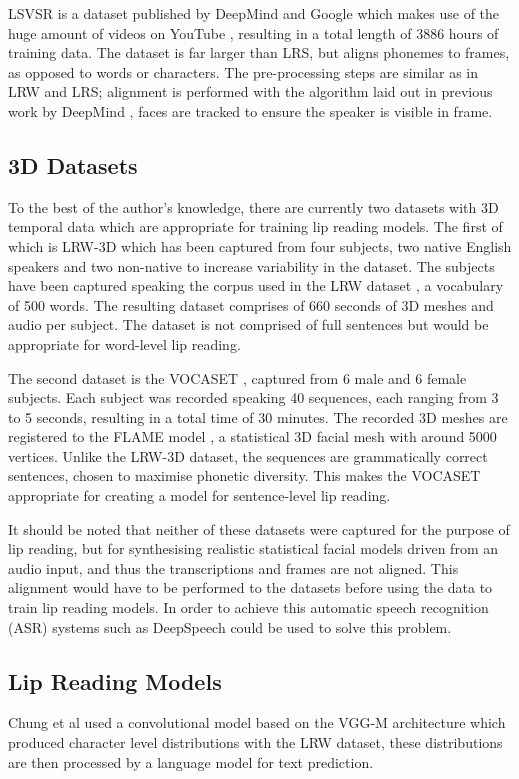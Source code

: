 \documentclass[12pt]{article}
\begin{document}
LSVSR is a dataset published by DeepMind and Google which makes use of the huge amount of videos on YouTube \cite{Shillingford2018}, resulting in a total length of 3886 hours of training data.
The dataset is far larger than LRS, but aligns phonemes to frames, as opposed to words or characters.
The pre-processing steps are similar as in LRW and LRS; alignment is performed with the algorithm laid out in previous work by DeepMind \cite{Liao2013}, faces are tracked to ensure the speaker is visible in frame.

\subsection{3D Datasets} \label{3D Datasets}
To the best of the author's knowledge, there are currently two datasets with 3D temporal data which are appropriate for training lip reading models.
The first of which is LRW-3D \cite{Tzirakis2019} which has been captured from four subjects, two native English speakers and two non-native to increase variability in the dataset.
The subjects have been captured speaking the corpus used in the LRW dataset \cite{Chung2016}, a vocabulary of 500 words.
The resulting dataset comprises of 660 seconds of 3D meshes and audio per subject.
The dataset is not comprised of full sentences but would be appropriate for word-level lip reading.

The second dataset is the VOCASET \cite{Cudeiro2019}, captured from 6 male and 6 female subjects.
Each subject was recorded speaking 40 sequences, each ranging from 3 to 5 seconds, resulting in a total time of 30 minutes.
The recorded 3D meshes are registered to the FLAME model \cite{Li2017}, a statistical 3D facial mesh with around 5000 vertices.
Unlike the LRW-3D dataset, the sequences are grammatically correct sentences, chosen to maximise phonetic diversity.
This makes the VOCASET appropriate for creating a model for sentence-level lip reading.

It should be noted that neither of these datasets were captured for the purpose of lip reading, but for synthesising realistic statistical facial models driven from an audio input, and thus the transcriptions and frames are not aligned.
This alignment would have to be performed to the datasets before using the data to train lip reading models.
In order to achieve this automatic speech recognition (ASR) systems such as DeepSpeech \cite{Hannun2014} could be used to solve this problem.

\subsection{Lip Reading Models}
Chung et al \cite{Chung2016} used a convolutional model based on the VGG-M architecture which produced character level distributions with the LRW dataset, these distributions are then processed by a language model for text prediction.
\end{document}
